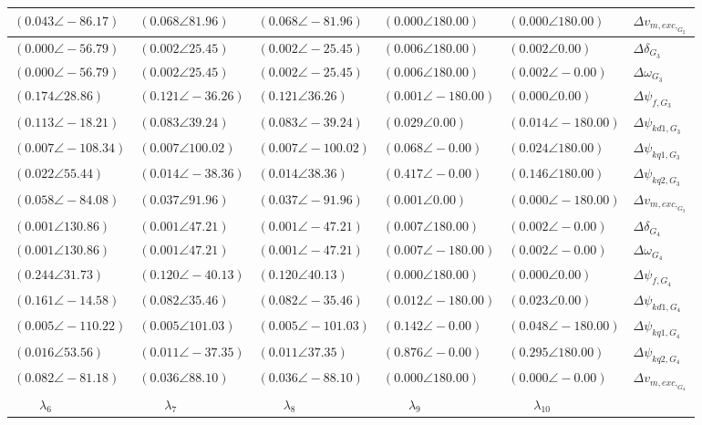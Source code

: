 \begin{tabular}{lllll|l}
$(0.043 \angle -86.17)$	& $\mathbf{(0.068 \angle 81.96)}$	& $\mathbf{(0.068 \angle -81.96)}$	& $(0.000 \angle 180.00)$	& $(0.000 \angle 180.00)$	& $\Delta v_{m,exc,_{G_2}}$ \\ 
 \hline 
$(0.000 \angle -56.79)$	& $(0.002 \angle 25.45)$	& $(0.002 \angle -25.45)$	& $(0.006 \angle 180.00)$	& $(0.002 \angle 0.00)$	& $\Delta\delta_{G_3}$ \\ 
$(0.000 \angle -56.79)$	& $(0.002 \angle 25.45)$	& $(0.002 \angle -25.45)$	& $(0.006 \angle 180.00)$	& $(0.002 \angle -0.00)$	& $\Delta\omega_{G_3}$ \\ 
$\mathbf{(0.174 \angle 28.86)}$	& $\mathbf{(0.121 \angle -36.26)}$	& $\mathbf{(0.121 \angle 36.26)}$	& $(0.001 \angle -180.00)$	& $(0.000 \angle 0.00)$	& $\Delta \psi_{f,G_3}$ \\ 
$\mathbf{(0.113 \angle -18.21)}$	& $\mathbf{(0.083 \angle 39.24)}$	& $\mathbf{(0.083 \angle -39.24)}$	& $(0.029 \angle 0.00)$	& $(0.014 \angle -180.00)$	& $\Delta \psi_{kd1,G_3}$ \\ 
$(0.007 \angle -108.34)$	& $(0.007 \angle 100.02)$	& $(0.007 \angle -100.02)$	& $\mathbf{(0.068 \angle -0.00)}$	& $(0.024 \angle 180.00)$	& $\Delta \psi_{kq1,G_3}$ \\ 
$(0.022 \angle 55.44)$	& $(0.014 \angle -38.36)$	& $(0.014 \angle 38.36)$	& $\mathbf{(0.417 \angle -0.00)}$	& $\mathbf{(0.146 \angle 180.00)}$	& $\Delta \psi_{kq2,G_3}$ \\ 
$\mathbf{(0.058 \angle -84.08)}$	& $(0.037 \angle 91.96)$	& $(0.037 \angle -91.96)$	& $(0.001 \angle 0.00)$	& $(0.000 \angle -180.00)$	& $\Delta v_{m,exc,_{G_3}}$ \\ 
 \hline 
$(0.001 \angle 130.86)$	& $(0.001 \angle 47.21)$	& $(0.001 \angle -47.21)$	& $(0.007 \angle 180.00)$	& $(0.002 \angle -0.00)$	& $\Delta\delta_{G_4}$ \\ 
$(0.001 \angle 130.86)$	& $(0.001 \angle 47.21)$	& $(0.001 \angle -47.21)$	& $(0.007 \angle -180.00)$	& $(0.002 \angle -0.00)$	& $\Delta\omega_{G_4}$ \\ 
$\mathbf{(0.244 \angle 31.73)}$	& $\mathbf{(0.120 \angle -40.13)}$	& $\mathbf{(0.120 \angle 40.13)}$	& $(0.000 \angle 180.00)$	& $(0.000 \angle 0.00)$	& $\Delta \psi_{f,G_4}$ \\ 
$\mathbf{(0.161 \angle -14.58)}$	& $\mathbf{(0.082 \angle 35.46)}$	& $\mathbf{(0.082 \angle -35.46)}$	& $(0.012 \angle -180.00)$	& $(0.023 \angle 0.00)$	& $\Delta \psi_{kd1,G_4}$ \\ 
$(0.005 \angle -110.22)$	& $(0.005 \angle 101.03)$	& $(0.005 \angle -101.03)$	& $\mathbf{(0.142 \angle -0.00)}$	& $(0.048 \angle -180.00)$	& $\Delta \psi_{kq1,G_4}$ \\ 
$(0.016 \angle 53.56)$	& $(0.011 \angle -37.35)$	& $(0.011 \angle 37.35)$	& $\mathbf{(0.876 \angle -0.00)}$	& $\mathbf{(0.295 \angle 180.00)}$	& $\Delta \psi_{kq2,G_4}$ \\ 
$\mathbf{(0.082 \angle -81.18)}$	& $(0.036 \angle 88.10)$	& $(0.036 \angle -88.10)$	& $(0.000 \angle 180.00)$	& $(0.000 \angle -0.00)$	& $\Delta v_{m,exc,_{G_4}}$ \\ 
 \hline 
\hline 
$\qquad\lambda_{6}$	&$\qquad\lambda_{7}$	&$\qquad\lambda_{8}$	&$\qquad\lambda_{9}$	&$\qquad\lambda_{10}$	&
\end{tabular}

